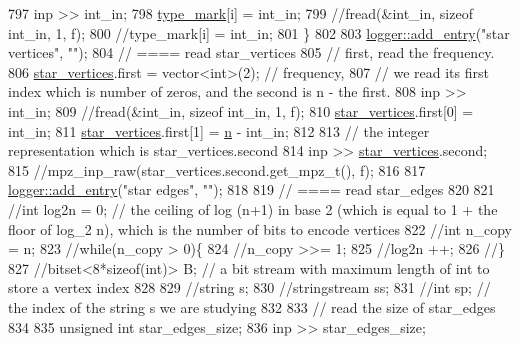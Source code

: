 \begin{DoxyCode}
797     inp >> int\_in;
798     \hyperlink{classmarked__graph__compressed_a86b00223525703e973415cbc9c94da68}{type\_mark}[i] = int\_in;
799     \textcolor{comment}{//fread(&int\_in, sizeof int\_in, 1, f);}
800     \textcolor{comment}{//type\_mark[i] = int\_in;}
801   \}
802 
803   \hyperlink{classlogger_a710163deb17bc81f70d53d285b8ac9ac}{logger::add\_entry}(\textcolor{stringliteral}{"star vertices"}, \textcolor{stringliteral}{""});
804   \textcolor{comment}{// ==== read star\_vertices}
805   \textcolor{comment}{// first, read the frequency.}
806   \hyperlink{classmarked__graph__compressed_a7a4ced4586e2e353f9076bd447df5208}{star\_vertices}.first = vector<int>(2); \textcolor{comment}{// frequency,}
807   \textcolor{comment}{// we read its first index which is number of zeros, and the second is n - the first.}
808   inp >> int\_in;
809   \textcolor{comment}{//fread(&int\_in, sizeof int\_in, 1, f);}
810   \hyperlink{classmarked__graph__compressed_a7a4ced4586e2e353f9076bd447df5208}{star\_vertices}.first[0] = int\_in;
811   \hyperlink{classmarked__graph__compressed_a7a4ced4586e2e353f9076bd447df5208}{star\_vertices}.first[1] = \hyperlink{classmarked__graph__compressed_a8d841016ddb11cfd33748c8deb6277ba}{n} - int\_in;
812 
813   \textcolor{comment}{// the integer representation which is star\_vertices.second}
814   inp >> \hyperlink{classmarked__graph__compressed_a7a4ced4586e2e353f9076bd447df5208}{star\_vertices}.second;
815   \textcolor{comment}{//mpz\_inp\_raw(star\_vertices.second.get\_mpz\_t(), f);}
816 
817   \hyperlink{classlogger_a710163deb17bc81f70d53d285b8ac9ac}{logger::add\_entry}(\textcolor{stringliteral}{"star edges"}, \textcolor{stringliteral}{""});
818 
819   \textcolor{comment}{// ==== read star\_edges}
820 
821   \textcolor{comment}{//int log2n = 0; // the ceiling of log (n+1) in base 2 (which is equal to 1 + the floor of log\_2 n),
       which is the number of bits to encode vertices}
822   \textcolor{comment}{//int n\_copy = n;}
823   \textcolor{comment}{//while(n\_copy > 0)\{}
824   \textcolor{comment}{//n\_copy >>= 1;}
825   \textcolor{comment}{//log2n ++;}
826   \textcolor{comment}{//\}}
827   \textcolor{comment}{//bitset<8*sizeof(int)> B; // a bit stream with maximum length of int to store a vertex index}
828 
829   \textcolor{comment}{//string s;}
830   \textcolor{comment}{//stringstream ss;}
831   \textcolor{comment}{//int sp; // the index of the string s we are studying }
832 
833   \textcolor{comment}{// read the size of star\_edges}
834 
835   \textcolor{keywordtype}{unsigned} \textcolor{keywordtype}{int} star\_edges\_size;
836   inp >> star\_edges\_size;

\end{DoxyCode}
